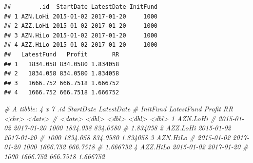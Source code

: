 \documentclass[]{tufte-book}
\newenvironment{Shaded}{}{}
\newcommand{\KeywordTok}[1]{\textcolor[rgb]{0.00,0.44,0.13}{\textbf{#1}}}
\newcommand{\DataTypeTok}[1]{\textcolor[rgb]{0.56,0.13,0.00}{#1}}
\newcommand{\StringTok}[1]{\textcolor[rgb]{0.25,0.44,0.63}{#1}}
\newcommand{\CommentTok}[1]{\textcolor[rgb]{0.38,0.63,0.69}{\textit{#1}}}
\newcommand{\OtherTok}[1]{\textcolor[rgb]{0.00,0.44,0.13}{#1}}
\newcommand{\ControlFlowTok}[1]{\textcolor[rgb]{0.00,0.44,0.13}{\textbf{#1}}}
\newcommand{\OperatorTok}[1]{\textcolor[rgb]{0.40,0.40,0.40}{#1}}
\newcommand{\NormalTok}[1]{#1}
\begin{document}
\begin{Shaded}
\end{Shaded}

\begin{verbatim}
##        .id  StartDate LatestDate InitFund
## 1 AZN.LoHi 2015-01-02 2017-01-20     1000
## 2 AZZ.LoHi 2015-01-02 2017-01-20     1000
## 3 AZN.HiLo 2015-01-02 2017-01-20     1000
## 4 AZZ.HiLo 2015-01-02 2017-01-20     1000
##   LatestFund   Profit       RR
## 1   1834.058 834.0580 1.834058
## 2   1834.058 834.0580 1.834058
## 3   1666.752 666.7518 1.666752
## 4   1666.752 666.7518 1.666752
\end{verbatim}

\begin{Shaded}
\begin{Highlighting}[]
\CommentTok{# A tibble: 4 x 7 .id StartDate LatestDate}
\CommentTok{# InitFund LatestFund Profit RR <chr> <date>}
\CommentTok{# <date> <dbl> <dbl> <dbl> <dbl> 1 AZN.LoHi}
\CommentTok{# 2015-01-02 2017-01-20 1000 1834.058 834.0580}
\CommentTok{# 1.834058 2 AZZ.LoHi 2015-01-02 2017-01-20}
\CommentTok{# 1000 1834.058 834.0580 1.834058 3 AZN.HiLo}
\CommentTok{# 2015-01-02 2017-01-20 1000 1666.752 666.7518}
\CommentTok{# 1.666752 4 AZZ.HiLo 2015-01-02 2017-01-20}
\CommentTok{# 1000 1666.752 666.7518 1.666752}
\end{Highlighting}
\end{Shaded}
\end{document}
